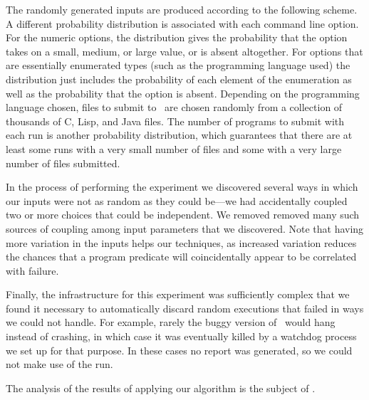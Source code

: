 The randomly generated inputs are produced according to the following
scheme.  A different probability distribution is associated with each
command line option.  For the numeric options, the distribution gives
the probability that the option takes on a small, medium, or large
value, or is absent altogether.  For options that are essentially
enumerated types (such as the programming language used) the
distribution just includes the probability of each element of the
enumeration as well as the probability that the option is absent.
Depending on the programming language chosen, files to submit to
\moss\ are chosen randomly from a collection of thousands of C, Lisp,
and Java files.  The number of programs to submit with each run is
another probability distribution, which guarantees that there are at
least some runs with a very small number of files and some with a very
large number of files submitted.  

In the process of performing the experiment we discovered several ways
in which our inputs were not as random as they could be---we had
accidentally coupled two or more choices that could be independent.
We removed removed many such sources of coupling among input parameters that we
discovered.  Note that having more variation in the inputs helps our
techniques, as increased variation reduces the chances that a program
predicate will coincidentally appear to be correlated with failure.

Finally, the infrastructure for this experiment was sufficiently complex
that we found it necessary to automatically discard random executions that
failed in ways we could not handle.  For example, rarely the buggy version of
\moss\ would hang instead of crashing, in which case it was eventually killed
by a watchdog process we set up for that purpose.  In these cases no report
was generated, so we could not make use of the run.

The analysis of the results of applying our algorithm is the
subject of .

